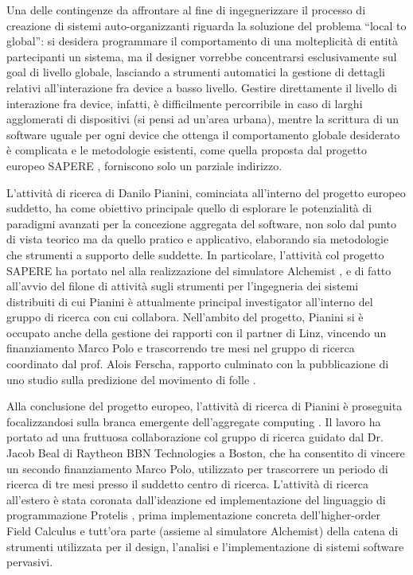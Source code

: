 \documentclass[10pt]{article}
\begin{document}
Una delle contingenze da affrontare al fine di ingegnerizzare il processo di creazione di sistemi 
auto-organizzanti riguarda la soluzione del problema ``local to global'': si desidera programmare il 
comportamento di una molteplicità di entità partecipanti un sistema, ma il designer vorrebbe 
concentrarsi esclusivamente sul goal di livello globale, lasciando a strumenti automatici la 
gestione di dettagli relativi all'interazione fra device a basso livello. Gestire direttamente il 
livello di interazione fra device, infatti, è difficilmente percorribile in caso di larghi 
agglomerati di dispositivi (si pensi ad un’area urbana), mentre la scrittura di un software uguale 
per ogni device che ottenga il comportamento globale desiderato è complicata e le metodologie 
esistenti, come quella proposta dal progetto europeo SAPERE \cite{ZambonelliPMC2015}, forniscono 
solo un parziale indirizzo.

L’attività di ricerca di Danilo Pianini, cominciata all'interno del progetto europeo suddetto, ha 
come obiettivo principale quello di esplorare le potenzialità di paradigmi avanzati per la 
concezione aggregata del software, non solo dal punto di vista teorico ma da quello pratico e 
applicativo, elaborando sia metodologie che strumenti a supporto delle suddette.
In particolare, l'attività col progetto SAPERE ha portato nel alla realizzazione del simulatore Alchemist \cite{PianiniJOS2013}, e di fatto all'avvio del filone di attività sugli strumenti per l'ingegneria dei sistemi distribuiti di cui Pianini è attualmente principal investigator all'interno del gruppo di ricerca con cui collabora. Nell'ambito del progetto, Pianini si è occupato anche della gestione dei rapporti con il partner di Linz, vincendo un finanziamento Marco Polo e trascorrendo tre mesi nel gruppo di ricerca coordinato dal prof. Alois Ferscha, rapporto culminato con la pubblicazione di uno studio sulla predizione del movimento di folle \cite{AnzengruberSocInfo2013}.

Alla conclusione del progetto europeo, l'attività di ricerca di Pianini è proseguita focalizzandosi sulla branca emergente dell'aggregate computing \cite{ViroliCoordination2012}. Il lavoro ha portato ad una fruttuosa collaborazione col gruppo di ricerca guidato dal Dr. Jacob Beal di Raytheon BBN Technologies a Boston, che ha consentito di vincere un secondo finanziamento Marco Polo, utilizzato per trascorrere un periodo di ricerca di tre mesi presso il suddetto centro di ricerca. L'attività di ricerca all'estero è stata coronata dall'ideazione ed implementazione del linguaggio di programmazione Protelis \cite{PianiniSAC2015}, prima implementazione concreta dell'higher-order Field Calculus \cite{DamianiFORTE2015} e tutt'ora parte (assieme al simulatore Alchemist) della catena di strumenti utilizzata per il design, l'analisi e l'implementazione di sistemi software pervasivi.
\end{document}
